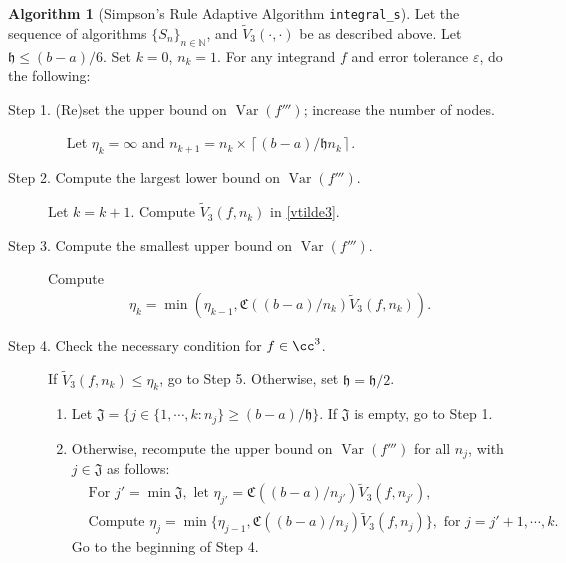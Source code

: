 \documentclass{iitthesis}
\DeclareMathOperator{\Var}{Var}
\theoremstyle{definition}
\newtheorem{algo}{Algorithm}
\theoremstyle{remark}
\begin{document}
\begin{algo} [Simpson's Rule Adaptive Algorithm {\tt integral\_s}] \label{multistageintegalgosimpson}
Let the sequence of algorithms $\{S_n\}_{n\in \mathbb{N}}$, %
and $\widetilde{V}_3(\cdot,\cdot)$ be as described above.
Let $\mathfrak{h}\le (b-a)/6$. Set $k=0$, $n_{k}=1$. For any integrand $f$ and error tolerance $\varepsilon$, do the following: %
\begin{description}
\item[Step 1. (Re)set the upper bound on $\Var(f''')$; increase the number of nodes.] $\quad$ Let $\eta_{k}=\infty$ and $n_{k+1}=n_k\times\left\lceil(b-a)/\mathfrak{h}n_{k}\right\rceil$.

\item[Step 2. Compute the largest lower bound on {$\Var(f''')$}.] Let $k=k+1$. Compute  $\widetilde{V}_3(f,n_k)$ in \eqref{vtilde3}.%

\item[Step 3. Compute the smallest upper bound on {$\Var(f''')$}.] Compute
    \begin{align*}
        \eta_{k}=\min\left(\eta_{k-1},\mathfrak{C}((b-a)/n_{k})\widetilde{V}_3(f,n_k)\right).
    \end{align*}

\item[Step 4. Check the necessary condition for $f \in \cc^3$.] If $\widetilde{V}_3(f,n_k) \le \eta_{k}$, go to Step 5.
  Otherwise, set $\mathfrak{h} = \mathfrak{h}/2$.
    \begin{enumerate}[label=\alph*)]
      \item Let $\mathfrak{J}=\{j\in\{1, \cdots, k: n_{j}\}\ge (b-a)/\mathfrak{h}\}$. If $\mathfrak{J}$ is empty, go to Step 1.
      \item Otherwise, recompute the upper bound on $\Var(f''')$ for all $n_{j}$, with $j \in \mathfrak{J}$ as follows:
      \begin{align*}
        &\text{For } j'=\min\mathfrak{J}, \text{ let } \eta_{j'}=\mathfrak{C}((b-a)/n_{j'})\widetilde{V}_3(f,n_{j'}), \\
        &\text{Compute } \eta_{j}=\min\{\eta_{j-1},\mathfrak{C}((b-a)/n_{j})\widetilde{V}_3(f,n_{j})\}, \text{ for } j=j'+1, \cdots, k.
      \end{align*}
      Go to the beginning of Step 4.
    \end{enumerate}



\end{description}
\end{algo}
\end{document}
